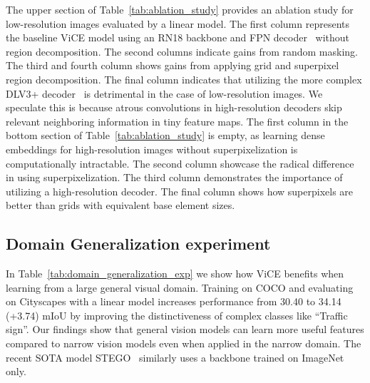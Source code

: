 \documentclass{bmvc2k}
\begin{document}
The upper section of Table~\ref{tab:ablation_study} provides an ablation study for low-resolution images evaluated by a linear model. The first column represents the baseline ViCE model using an RN18 backbone and FPN decoder~\cite{Lin2017FPN} without region decomposition. The second columns indicate gains from random masking. The third and fourth column shows gains from applying grid and superpixel region decomposition. The final column indicates that utilizing the more complex DLV3+ decoder~\cite{Chen2018DeepLabV3Plus} is detrimental in the case of low-resolution images. We speculate this is because atrous convolutions in high-resolution decoders skip relevant neighboring information in tiny feature maps. 
The first column in the bottom section of Table~\ref{tab:ablation_study} is empty, as learning dense embeddings for high-resolution images without superpixelization is computationally intractable. The second column showcase the radical difference in using superpixelization. The third column demonstrates the importance of utilizing a high-resolution decoder. The final column shows how superpixels are better than grids with equivalent base element sizes.

\subsection{Domain Generalization experiment}

In Table~\ref{tab:domain_generalization_exp} we show how ViCE benefits when learning from a large general visual domain. Training on COCO and evaluating on Cityscapes with a linear model increases performance from 30.40 to 34.14 (+3.74) mIoU by improving the distinctiveness of complex classes like ``Traffic sign''. Our findings show that general vision models can learn more useful features compared to narrow vision models even when applied in the narrow domain. The recent SOTA model STEGO~\cite{Hamilton2022STEGO} similarly uses a backbone trained on ImageNet only.
\end{document}
